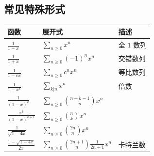\documentclass[11pts, a4paper]{ctexart}
\begin{document}
\subsection*{常见特殊形式}

\begin{center}
\begin{tabular}{lll}
\toprule
函数 & 展开式 & 描述 \\
\midrule
$\frac{1}{1-x}$ & $\sum_{n\ge 0}x^n$ & 全 $1$ 数列 \\
$\frac{1}{1+x}$ & $\sum_{n\ge 0}(-1)^nx^n$ & 交错数列 \\
$\frac{1}{1-cx}$ & $\sum_{n\ge 0}c^nx^n$ & 等比数列 \\
$\frac{1}{1-x^k}$ & $\sum_{k|n}x^n$ & 倍数 \\
$\frac{1}{(1-x)^k}$ & $\sum_{n\ge 0}\binom{n+k-1}{n}x^n$ &  \\
$\frac{x^k}{(1-x)^{k+1}}$ & $\sum_{n\ge 0}\binom{n}{k}x^n$ &  \\
$\frac{1}{\sqrt{1-4x}}$ & $\sum_{n\ge 0}\binom{2n}{n}x^n$ &  \\
$\frac{1-\sqrt{1-4x}}{2x}$ & $\sum_{n\ge 0}\binom{2n+1}{n}\frac{1}{2n+1}x^n$ & 卡特兰数\\
\bottomrule
\end{tabular}
\end{center}
\end{document}

